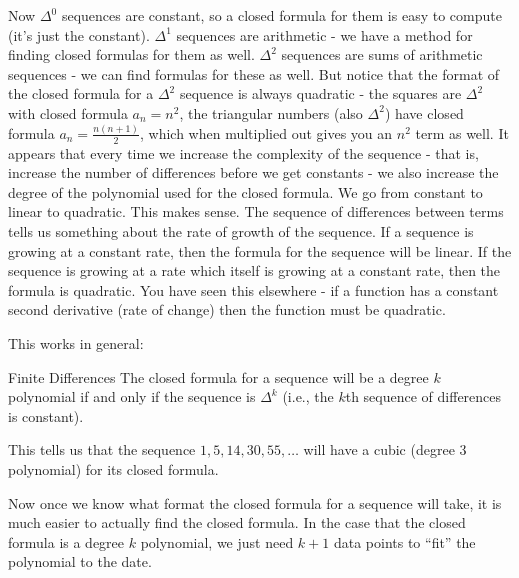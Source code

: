 \documentclass[12pt]{article}
\begin{document}
Now $\Delta^0$ sequences are constant, so a closed formula for them is easy to compute (it's just the constant). $\Delta^1$ sequences are arithmetic - we have a method for finding closed formulas for them as well.  $\Delta^2$ sequences are sums of arithmetic sequences - we can find formulas for these as well.  But notice that the format of the closed formula for a $\Delta^2$ sequence is always quadratic - the squares are $\Delta^2$ with closed formula $a_n= n^2$, the triangular numbers (also $\Delta^2$) have closed formula $a_n = \frac{n(n+1)}{2}$, which when multiplied out gives you an $n^2$ term as well.  It appears that every time we increase the complexity of the sequence - that is, increase the number of differences before we get constants - we also increase the degree of the polynomial used for the closed formula.  We go from constant to linear to quadratic.  This makes sense.  The sequence of differences between terms tells us something about the rate of growth of the sequence.  If a sequence is growing at a constant rate, then the formula for the sequence will be linear.  If the sequence is growing at a rate which itself is growing at a constant rate, then the formula is quadratic.  You have seen this elsewhere - if a function has a constant second derivative (rate of change) then the function must be quadratic.

This works in general:

\begin{defbox}{Finite Differences}
The closed formula for a sequence will be a degree $k$ polynomial if and only if the sequence is $\Delta^k$ (i.e., the $k$th sequence of differences is constant).
\end{defbox}

This tells us that the sequence $1, 5, 14, 30, 55, \ldots$ will have a cubic (degree 3 polynomial) for its closed formula.  

Now once we know what format the closed formula for a sequence will take, it is much easier to actually find the closed formula.  In the case that the closed formula is a degree $k$ polynomial, we just need $k+1$ data points to ``fit'' the polynomial to the date.
\end{document}
